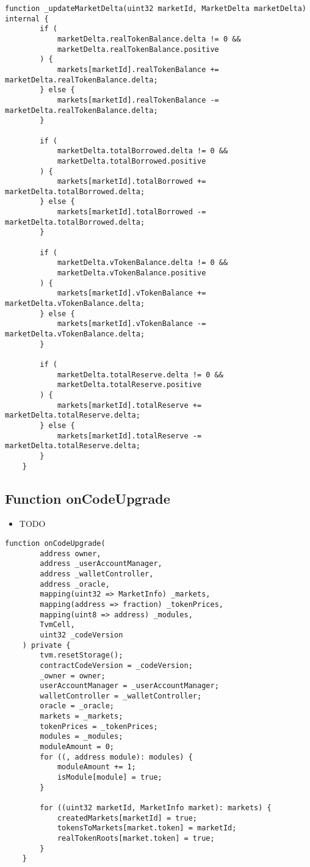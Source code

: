 \begin{lstlisting}[firstnumber=152]
    function _updateMarketDelta(uint32 marketId, MarketDelta marketDelta) internal {
        if (
            marketDelta.realTokenBalance.delta != 0 &&
            marketDelta.realTokenBalance.positive
        ) {
            markets[marketId].realTokenBalance += marketDelta.realTokenBalance.delta;
        } else {
            markets[marketId].realTokenBalance -= marketDelta.realTokenBalance.delta;
        }

        if (
            marketDelta.totalBorrowed.delta != 0 &&
            marketDelta.totalBorrowed.positive
        ) {
            markets[marketId].totalBorrowed += marketDelta.totalBorrowed.delta;
        } else {
            markets[marketId].totalBorrowed -= marketDelta.totalBorrowed.delta;
        }

        if (
            marketDelta.vTokenBalance.delta != 0 &&
            marketDelta.vTokenBalance.positive
        ) {
            markets[marketId].vTokenBalance += marketDelta.vTokenBalance.delta;
        } else {
            markets[marketId].vTokenBalance -= marketDelta.vTokenBalance.delta;
        }

        if (
            marketDelta.totalReserve.delta != 0 &&
            marketDelta.totalReserve.positive
        ) {
            markets[marketId].totalReserve += marketDelta.totalReserve.delta;
        } else {
            markets[marketId].totalReserve -= marketDelta.totalReserve.delta;
        }
    }
\end{lstlisting}

\subsection{Function onCodeUpgrade}

\noindent\begin{itemize}
\item TODO
\end{itemize}

\begin{lstlisting}[firstnumber=64]
    function onCodeUpgrade(
        address owner,
        address _userAccountManager,
        address _walletController,
        address _oracle,
        mapping(uint32 => MarketInfo) _markets,
        mapping(address => fraction) _tokenPrices,
        mapping(uint8 => address) _modules,
        TvmCell,
        uint32 _codeVersion
    ) private {
        tvm.resetStorage();
        contractCodeVersion = _codeVersion;
        _owner = owner;
        userAccountManager = _userAccountManager;
        walletController = _walletController;
        oracle = _oracle;
        markets = _markets;
        tokenPrices = _tokenPrices;
        modules = _modules;
        moduleAmount = 0;
        for ((, address module): modules) {
            moduleAmount += 1;
            isModule[module] = true;
        }

        for ((uint32 marketId, MarketInfo market): markets) {
            createdMarkets[marketId] = true;
            tokensToMarkets[market.token] = marketId;
            realTokenRoots[market.token] = true;
        }
    }
\end{lstlisting}

